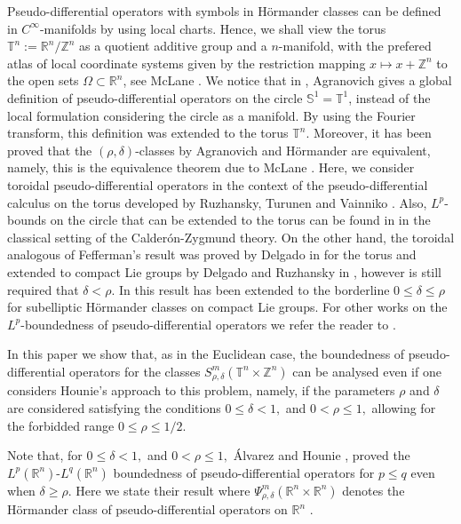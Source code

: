 \documentclass[12pt, reqno]{amsart}
\theoremstyle{definition}
\theoremstyle{remark}
\numberwithin{equation}{section}
\begin{document}
Pseudo-differential operators with symbols in Hörmander classes can be defined in $C^\infty$-manifolds by using local charts. Hence, we shall view the torus $\mathbb{T}^n:=\mathbb{R}^n/\mathbb{Z}^n$ as a quotient additive group and a $n$-manifold, with the prefered atlas of local coordinate systems given by the restriction mapping $x\mapsto x + \mathbb{Z}^n$ to the open sets $\Omega \subset \mathbb{R}^n$, see McLane \cite{mclane}. We notice that in \cite{agranovich}, Agranovich gives a global definition of pseudo-differential operators on the circle $\mathbb{S}^1=\mathbb{T}^1$, instead of the local formulation considering the circle as a manifold.  By using the Fourier transform, this definition was extended to the torus $\mathbb{T}^n$. Moreover, it has been proved that the $(\rho,\delta)$-classes by Agranovich and Hörmander are equivalent, namely, this is the equivalence theorem due to  McLane \cite{mclane}. Here, we consider toroidal pseudo-differential operators in the context of the pseudo-differential calculus on the torus developed by Ruzhansky, Turunen and Vainniko \cite{ruzhansky-turunen2, ruzhansky-turunen}. Also, $L^p$-bounds on the circle that can be extended to the torus can be found in \cite{wong} in the classical setting of the Calder\'on-Zygmund theory. On the other hand, the toroidal analogous of Fefferman's result was proved by Delgado in \cite{delgado} for the torus and extended to compact Lie groups by Delgado and Ruzhansky in \cite{delgado-ruzhansky}, however is still required that $\delta<\rho$. In \cite{cardona-ruzhansky-subelliptic} this result has been extended to the borderline $0\leq \delta\leq \rho$ for subelliptic Hörmander classes on compact Lie groups. For other works on the $L^p$-boundedness of pseudo-differential operators we refer the reader to \cite{cardona, molahajloo-wong, ruzhansky-turunen-quant}.

In this paper we show that, as in the Euclidean case, the boundedness of pseudo-differential operators for the classes $S^m_{\rho,\delta}(\mathbb{T}^n\times \mathbb{Z}^n )$  can be analysed even if one considers Hounie's approach to this problem, namely, if the parameters $\rho$ and $\delta$ are considered satisfying the conditions $0\leq \delta<1,$ and $0<\rho\leq 1,$ allowing for the forbidded range $0\leq \rho\leq 1/2.$ 

Note that, for $0\leq \delta<1,$ and $0<\rho\leq 1,$ \'Alvarez and Hounie \cite{alvarez-hounie}, proved the $L^p(\mathbb{R}^n)$-$L^q(\mathbb{R}^n)$ boundedness of  pseudo-differential operators for $p\leq q$ even when $\delta \geq \rho$. Here we state their result where $\Psi^m_{\rho, \delta}(\mathbb{R}^n \times \mathbb{R}^n)$ denotes the Hörmander class of pseudo-differential operators on $\mathbb{R}^n$ \cite{hormander}.
\end{document}
